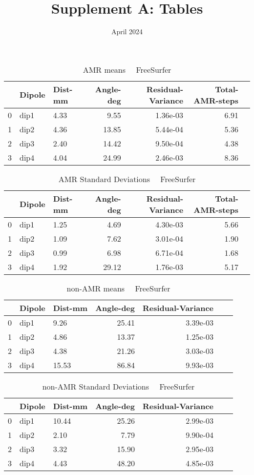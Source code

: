 \documentclass{article}
\title{Supplement A: Tables}
\date{April 2024}
\begin{document}
\maketitle
\setlength{\parindent}{0pt}


\begin{table}
\begin{tabular}{lllrrrr}
\toprule
& Dipole& Dist-mm& Angle-deg& Residual-Variance& Total-AMR-steps\\
\midrule
0 & dip1 & 4.33 & 9.55 & 1.36e-03 & 6.91\\
1 & dip2 & 4.36 & 13.85 & 5.44e-04 & 5.36\\
2 & dip3 & 2.40 & 14.42 & 9.50e-04 & 4.38\\
3 & dip4 & 4.04 & 24.99 & 2.46e-03 & 8.36\\
\end{tabular}
\caption{AMR means \ \textemdash \ FreeSurfer}
\end{table}
\begin{table}
\begin{tabular}{lllrrrr}
\toprule
& Dipole& Dist-mm& Angle-deg& Residual-Variance& Total-AMR-steps\\
\midrule
0 & dip1 & 1.25 & 4.69 & 4.30e-03 & 5.66\\
1 & dip2 & 1.09 & 7.62 & 3.01e-04 & 1.90\\
2 & dip3 & 0.99 & 6.98 & 6.71e-04 & 1.68\\
3 & dip4 & 1.92 & 29.12 & 1.76e-03 & 5.17\\
\end{tabular}
\caption{AMR Standard Deviations \ \textemdash \ FreeSurfer}
\end{table}
\begin{table}
\begin{tabular}{lllrrrr}
\toprule
& Dipole& Dist-mm& Angle-deg& Residual-Variance\\
\midrule
0 & dip1 & 9.26 & 25.41 & 3.39e-03\\
1 & dip2 & 4.86 & 13.37 & 1.25e-03\\
2 & dip3 & 4.38 & 21.26 & 3.03e-03\\
3 & dip4 & 15.53 & 86.84 & 9.93e-03\\
\end{tabular}
\caption{non-AMR means \ \textemdash \ FreeSurfer}
\end{table}
\begin{table}
\begin{tabular}{lllrrrr}
\toprule
& Dipole& Dist-mm& Angle-deg& Residual-Variance\\
\midrule
0 & dip1 & 10.44 & 25.26 & 2.99e-03\\
1 & dip2 & 2.10 & 7.79 & 9.90e-04\\
2 & dip3 & 3.32 & 15.90 & 2.95e-03\\
3 & dip4 & 4.43 & 48.20 & 4.85e-03\\
\end{tabular}
\caption{non-AMR Standard Deviations \ \textemdash \ FreeSurfer}
\end{table}
\end{document}
